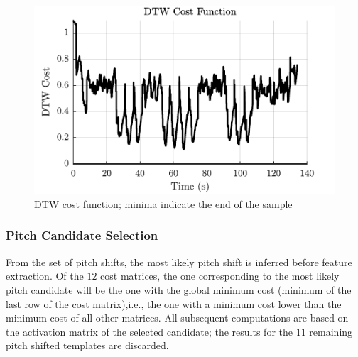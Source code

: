 \documentclass{article}
\begin{document}
\begin{figure}[t]
\centering
\includegraphics[width=\linewidth]{cost.pdf}
\caption{DTW cost function; minima indicate the end of the sample}
\label{fig3}
\end{figure}


%

\subsubsection{Pitch Candidate Selection}
From the set of pitch shifts, the most likely pitch shift is inferred before feature extraction. Of the $12$ cost matrices, the one corresponding to the most likely pitch candidate will be the one with the global minimum cost (minimum of the last row of the cost matrix),i.e., the one with a minimum cost lower than the minimum cost of all other matrices. All subsequent computations are based on the activation matrix of the selected candidate; the results for the $11$ remaining pitch shifted templates are discarded.
\end{document}
